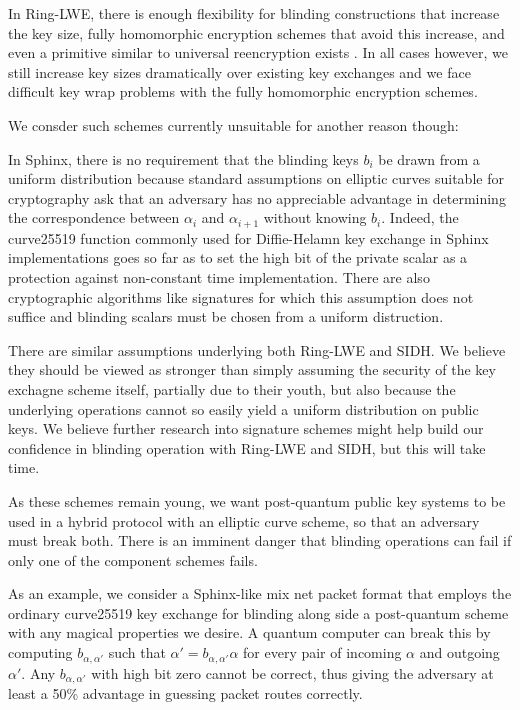 \documentclass[twoside,letterpaper]{sig-alternate}
\begin{document}
In Ring-LWE, there is enough flexibility for blinding constructions
that increase the key size, fully homomorphic encryption schemes that
avoid this increase, and even a primitive similar to universal
reencryption exists \cite{963628}.  In all cases however, we still
increase key sizes dramatically over existing key exchanges and we face
difficult key wrap problems with the fully homomorphic encryption
schemes.

\smallskip

We consder such schemes currently unsuitable for another reason though: 

In Sphinx, there is no requirement that the blinding keys $b_i$ be
drawn from a uniform distribution because standard assumptions on
elliptic curves suitable for cryptography ask that an adversary has
no appreciable advantage in determining the correspondence between
$\alpha_i$ and $\alpha_{i+1}$ without knowing $b_i$.  
Indeed, the curve25519 function commonly used for Diffie-Helamn key
exchange in Sphinx implementations goes so far as to set the high bit
of the private scalar as a protection against non-constant time
implementation.
There are also cryptographic algorithms like signatures for which
this assumption does not suffice and blinding scalars must be chosen
from a uniform distruction.

There are similar assumptions underlying both Ring-LWE and SIDH.
We believe they should be viewed as stronger than simply assuming the
security of the key exchagne scheme itself, partially due to their
youth, but also because the underlying operations cannot so easily
yield a uniform distribution on public keys.  We believe further
research into signature schemes might help build our confidence in
blinding operation with Ring-LWE and SIDH, but this will take time.

As these schemes remain young, we want post-quantum public key
systems to be used in a hybrid protocol with an elliptic curve scheme,
so that an adversary must break both.  There is an imminent danger
that blinding operations can fail if only one of the component schemes
fails.

As an example, we consider a Sphinx-like mix net packet format that
employs the ordinary curve25519 key exchange for blinding along side
a post-quantum scheme with any magical properties we desire.  
A quantum computer can break this by computing $b_{\alpha,\alpha'}$
such that $\alpha' = b_{\alpha,\alpha'} \alpha$ for every pair of
incoming $\alpha$ and outgoing $\alpha'$.  Any $b_{\alpha,\alpha'}$
with high bit zero cannot be correct, thus giving the adversary at
least a 50\% advantage in guessing packet routes correctly.
\end{document}
